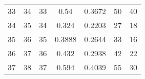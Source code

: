 \begin{table}
\begin{adjustbox}{width=1.2\textwidth,center=\textwidth}
\begin{tabular}{ccccccc}
33                                                        & 34                                                          & 33                                                  & 0.54                                                                       & 0.3672                                                                    & 50                                                                          & 40                                                                               \\
34                                                        & 35                                                          & 34                                                  & 0.324                                                                      & 0.2203                                                                    & 27                                                                          & 18                                                                               \\
35                                                        & 36                                                          & 35                                                  & 0.3888                                                                     & 0.2644                                                                    & 33                                                                          & 16                                                                               \\
36                                                        & 37                                                          & 36                                                  & 0.432                                                                      & 0.2938                                                                    & 42                                                                          & 22                                                                               \\
37                                                        & 38                                                          & 37                                                  & 0.594                                                                      & 0.4039                                                                    & 55                                                                          & 30                                                                               \\

\end{tabular}
\end{adjustbox}
\end{table}
